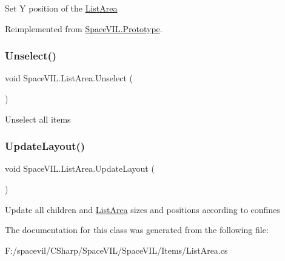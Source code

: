 Set Y position of the \mbox{\hyperlink{class_space_v_i_l_1_1_list_area}{List\+Area}} 



Reimplemented from \mbox{\hyperlink{class_space_v_i_l_1_1_prototype}{Space\+V\+I\+L.\+Prototype}}.

\mbox{\label{class_space_v_i_l_1_1_list_area_ac7ed057dd6d34a265aaacca971c61b2b}} 
\subsubsection{\texorpdfstring{Unselect()}{Unselect()}}
{\footnotesize\ttfamily void Space\+V\+I\+L.\+List\+Area.\+Unselect (\begin{DoxyParamCaption}{ }\end{DoxyParamCaption})}



Unselect all items 

\mbox{\label{class_space_v_i_l_1_1_list_area_af0fb95222910f6e85274a38dfa506174}} 
\subsubsection{\texorpdfstring{Update\+Layout()}{UpdateLayout()}}
{\footnotesize\ttfamily void Space\+V\+I\+L.\+List\+Area.\+Update\+Layout (\begin{DoxyParamCaption}{ }\end{DoxyParamCaption})}



Update all children and \mbox{\hyperlink{class_space_v_i_l_1_1_list_area}{List\+Area}} sizes and positions according to confines 



The documentation for this class was generated from the following file\+:\begin{DoxyCompactItemize}
\item 
F\+:/spacevil/\+C\+Sharp/\+Space\+V\+I\+L/\+Space\+V\+I\+L/\+Items/List\+Area.\+cs\end{DoxyCompactItemize}
